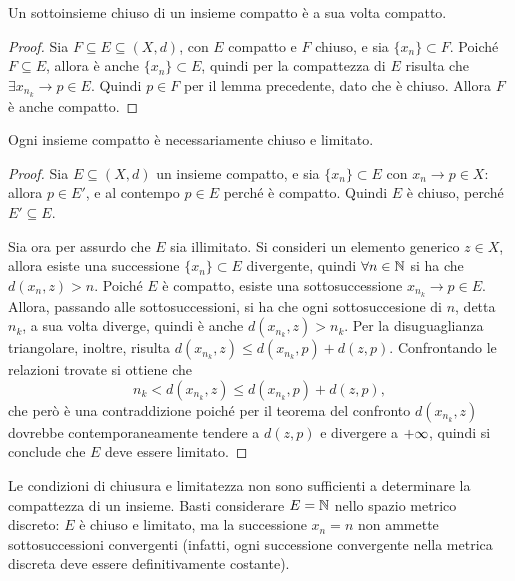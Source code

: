 \begin{teorema}
Un sottoinsieme chiuso di un insieme compatto è a sua volta compatto.
\end{teorema}
\begin{proof}
Sia $F\subseteq E\subseteq(X,d)$, con $E$ compatto e $F$ chiuso, e sia $\{x_n\}\subset F$. Poiché $F\subseteq E$, allora è anche $\{x_n\}\subset E$, quindi per la compattezza di $E$ risulta che $\exists x_{n_k}\to p\in E$. Quindi $p\in F$ per il lemma precedente, dato che è chiuso. Allora $F$ è anche compatto.
\end{proof}
\begin{teorema}
\label{t:compatto_allora_limitato}
Ogni insieme compatto è necessariamente chiuso e limitato.
\end{teorema}
\begin{proof}
Sia $E\subseteq(X,d)$ un insieme compatto, e sia $\{x_n\}\subset E$ con $x_n\to p\in X$: allora $p\in E'$, e al contempo $p\in E$ perché è compatto. Quindi $E$ è chiuso, perché $E'\subseteq E$.

Sia ora per assurdo che $E$ sia illimitato. Si consideri un elemento generico $z\in X$, allora esiste una successione $\{x_n\}\subset E$ divergente, quindi $\forall n\in\mathbb{N}$ si ha che $d(x_n,z)>n$. Poiché $E$ è compatto, esiste una sottosuccessione $x_{n_k}\to p\in E$. Allora, passando alle sottosuccessioni, si ha che ogni sottosuccesione di $n$, detta $n_k$, a sua volta diverge, quindi è anche $d(x_{n_k},z)>n_k$. Per la disuguaglianza triangolare, inoltre, risulta $d(x_{n_k},z)\leq d(x_{n_k},p)+d(z,p)$. Confrontando le relazioni trovate si ottiene che
\[
n_k<d(x_{n_k},z)\leq d(x_{n_k},p)+d(z,p),
\]
che però è una contraddizione poiché per il teorema del confronto $d(x_{n_k},z)$ dovrebbe contemporaneamente tendere a $d(z,p)$ e divergere a $+\infty$, quindi si conclude che $E$ deve essere limitato.
\end{proof}
Le condizioni di chiusura e limitatezza non sono sufficienti a determinare la compattezza di un insieme. Basti considerare $E=\mathbb{N}$ nello spazio metrico discreto: $E$ è chiuso e limitato, ma la successione $x_n=n$ non ammette sottosuccessioni convergenti (infatti, ogni successione convergente nella metrica discreta deve essere definitivamente costante).

